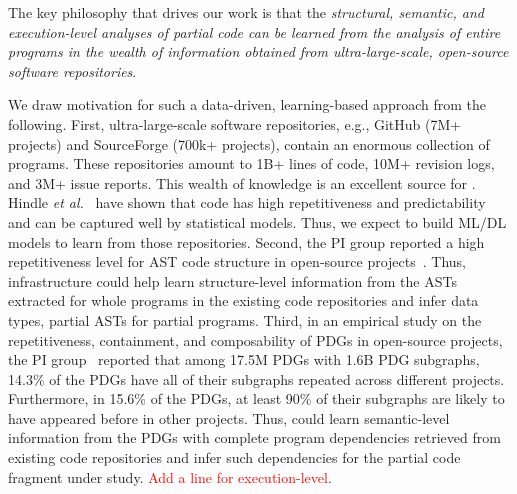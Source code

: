 \begin{center}
    \begin{minipage}{36em}
The key philosophy that drives our work is that the {\em structural, semantic, and execution-level analyses of partial code can be learned from the analysis of entire programs in the wealth of information obtained from ultra-large-scale, open-source software repositories}.
    \end{minipage}
\end{center}



We draw motivation for such a data-driven, learning-based approach from the following. First, ultra-large-scale software repositories, e.g., GitHub (7M+ projects) and SourceForge (700k+ projects), contain an enormous collection of programs. These repositories amount to 1B+ lines of code, 10M+ revision logs, and 3M+ issue reports. This wealth of knowledge is an excellent source for {\tool}. Hindle {\em et al.}~\cite{naturalness-icse12} have shown that code has high repetitiveness and predictability and can be captured well by statistical models. Thus, we expect to build ML/DL models to learn from those repositories. 
Second, the PI group reported a high repetitiveness level for AST code structure in open-source projects~\cite{icse15}. Thus, {\tool} infrastructure could help learn structure-level information from the ASTs extracted for whole programs in the existing code repositories and infer data types, partial ASTs for partial programs. Third, in an empirical study on the repetitiveness, containment, and composability of PDGs in open-source projects, the PI group~\cite{msr16} reported that among 17.5M PDGs with 1.6B PDG subgraphs, 14.3\% of the PDGs have all of their subgraphs repeated across different projects. Furthermore, in 15.6\% of the PDGs, at least 90\% of their subgraphs are likely to have appeared before in other projects. 
Thus, {\tool} could learn semantic-level information from the PDGs with complete program dependencies retrieved from existing code repositories and infer such dependencies for the partial code fragment under study. \textcolor{red}{Add a line for execution-level}.

